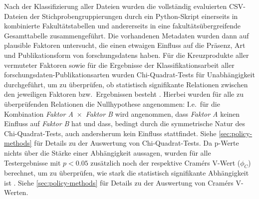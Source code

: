 Nach der Klassifizierung aller Dateien wurden die vollständig evaluierten CSV-Dateien der Stichprobengruppierungen durch ein Python-Skript \autocite{my-dataset} einerseits in kombinierte Fakultätstabellen und andererseits in eine fakultätsübergreifende Gesamttabelle zusammengeführt.
Die vorhandenen Metadaten wurden dann auf plausible Faktoren untersucht, die einen etwaigen Einfluss auf die Präsenz, Art und Publikationsform von \glspl{forschungsdaten} haben.
Für die Kreuzprodukte aller vermuteter Faktoren sowie für die Ergebnisse der Klassifikationsarbeit aller \gls{forschungsdaten}-Publikationsarten wurden Chi-Quadrat-Tests für Unabhängigkeit durchgeführt, um zu überprüfen, ob statistisch signifikante Relationen zwischen den jeweiligen Faktoren bzw.~Ergebnissen besteht \autocite{Pearson1900,Pearson1904}.
Hierbei wurden für alle zu überprüfenden Relationen die Nullhypothese angenommen:
I.e.~für die Kombination \textit{Faktor A}~$\times$~\textit{Faktor B} wird angenommen, dass \textit{Faktor A} keinen Einfluss auf \textit{Faktor B} hat und dass, bedingt durch die symmetrische Natur des Chi-Quadrat-Tests, auch andersherum kein Einfluss stattfindet.
Siehe \cref{sec:policy-methods} für Details zu der Auswertung von Chi-Quadrat-Tests.
Da p-Werte nichts über die Stärke einer Abhängigkeit aussagen, wurden für alle Testergebnisse mit $p<\num{0,05}$ zusätzlich noch der respektive Cramérs V-Wert ($\phi_C$) berechnet, um zu überprüfen, wie stark die statistisch signifikante Abhängigkeit ist \autocite{Cramer1946}.
Siehe \cref{sec:policy-methods} für Details zu der Auswertung von Cramérs V-Werten.

